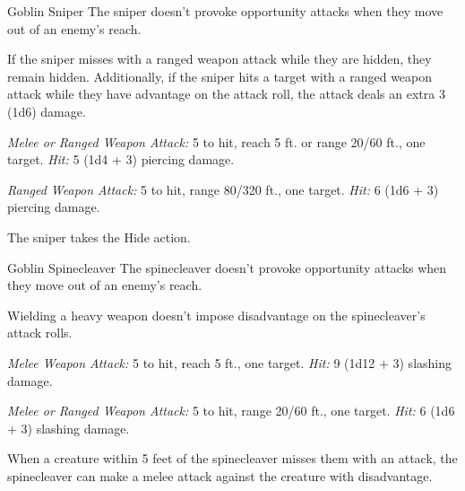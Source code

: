 \documentclass[10pt,a4paper,twoside,bg=print,twocolumn,openany,nodeprecatedcode]{dndbook}
\begin{document}
\begin{DndMonster}[float=t]{Goblin Sniper}
\DndMonsterBasics[
armor-class = {14 (\textit{leather armor})},
hit-points = {\DndDice{3d6 + 3}},
speed = {30 ft., climb 20 ft.}
]
\DndMonsterAbilityScores[
 str = 8,
 dex = 16,
 con = 12,
 int = 10,
 wis = 12,
 cha = 8
]
\DndMonsterDetails[
skills = {Perception +3, Stealth +5},
senses = {darkvision 60 ft., passive perception 13},
languages = {Common, Goblin},
challenge = 1/2,
]
The sniper doesn't provoke opportunity attacks when they move out of an enemy's reach.

If the sniper misses with a ranged weapon attack while they are hidden, they remain hidden. Additionally, if the sniper hits a target with a ranged weapon attack while they have advantage on the attack roll, the attack deals an extra 3 (1d6) damage.

\textsl{Melee or Ranged Weapon Attack:} 5 to hit, reach 5 ft. or range 20/60 ft., one target. \textsl{Hit:} 5 (1d4 + 3) piercing damage.

\textsl{Ranged Weapon Attack:} 5 to hit, range 80/320 ft., one target. \textsl{Hit:} 6 (1d6 + 3) piercing damage.

The sniper takes the Hide action.

\end{DndMonster}



\begin{DndMonster}[float=t]{Goblin Spinecleaver}
\DndMonsterBasics[
armor-class = {14 (\textit{hide armor})},
hit-points = {\DndDice{6d6 + 12}},
speed = {30 ft., climb 20 ft.}
]
\DndMonsterAbilityScores[
 str = 16,
 dex = 14,
 con = 14,
 int = 10,
 wis = 10,
 cha = 8
]
\DndMonsterDetails[
saving-throws = {Con +4},
skills = {Athletics +5},
senses = {darkvision 60 ft., passive perception 10},
languages = {Common, Goblin},
challenge = 1,
]
The spinecleaver doesn't provoke opportunity attacks when they move out of an enemy's reach.

Wielding a heavy weapon doesn't impose disadvantage on the spinecleaver's attack rolls.

\textsl{Melee Weapon Attack:} 5 to hit, reach 5 ft., one target. \textsl{Hit:} 9 (1d12 + 3) slashing damage.

\textsl{Melee or Ranged Weapon Attack:} 5 to hit, range 20/60 ft., one target. \textsl{Hit:} 6 (1d6 + 3) slashing damage.

When a creature within 5 feet of the spinecleaver misses them with an attack, the spinecleaver can make a melee attack against the creature with disadvantage.

\end{DndMonster}
\end{document}
